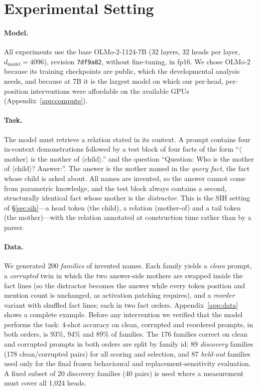 \section{Experimental Setting}
\label{sec:setting}

\paragraph{Model.}
All experiments use the base OLMo-2-1124-7B \citep{olmo2024olmo2} (32 layers, 32
heads per layer, $d_{\text{model}}{=}4096$), revision
\texttt{7df9a82}, without fine-tuning, in fp16. We chose OLMo-2 because its training
checkpoints are public, which the developmental analysis needs, and because at 7B it
is the largest model on which our per-head, per-position interventions were
affordable on the available GPUs (Appendix~\ref{app:compute}).

\paragraph{Task.}
The model must retrieve a relation stated in its context. A prompt contains four
in-context demonstrations followed by a test block of four facts of the form
``$\langle$mother$\rangle$ is the mother of $\langle$child$\rangle$.'' and the
question ``Question: Who is the mother of $\langle$child$\rangle$? Answer:''. The
answer is the mother named in the \emph{query fact}, the fact whose child is asked
about. All names are invented, so the answer cannot come from parametric knowledge,
and the test block always contains a second, structurally identical fact whose mother
is the \emph{distractor}. This is the SIH setting of \S\ref{sec:sih}---a head token
(the child), a relation (mother-of) and a tail token (the mother)---with the relation
annotated at construction time rather than by a parser.

\paragraph{Data.}
We generated 200 \emph{families} of invented names. Each family yields a
\emph{clean} prompt, a \emph{corrupted} twin in which the two answer-side mothers are
swapped inside the fact lines (so the distractor becomes the answer while every token
position and mention count is unchanged, as activation patching requires), and a
\emph{reorder} variant with shuffled fact lines; each in two fact orders.
Appendix~\ref{app:data} shows a complete example. Before any intervention we
verified that the model performs the task: 4-shot accuracy on clean, corrupted and
reordered prompts, in both orders, is 93\%, 94\% and 89\% of families. The 176
families correct on clean and corrupted prompts in both orders are split by family
id: 89 \emph{discovery} families (178 clean/corrupted pairs) for all scoring and
selection, and 87 \emph{held-out} families used only for the final frozen
behavioural and replacement-sensitivity evaluation. A fixed subset of 20 discovery families (40 pairs) is used
where a measurement must cover all 1,024 heads.

